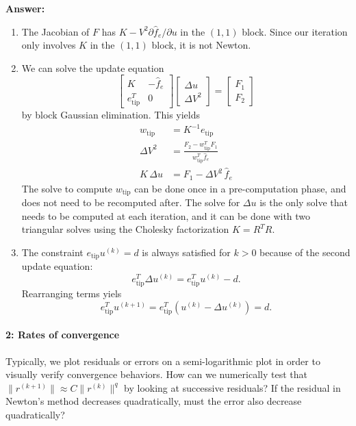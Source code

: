 \documentclass[12pt, leqno]{article}
\begin{document}
{\bf Answer:}
\begin{enumerate}
\item The Jacobian of $F$ has $K-V^2 \partial \hat{f}_e/\partial u$
  in the $(1,1)$ block.  Since our iteration only involves $K$ in the
  $(1,1)$ block, it is not Newton.
\item We can solve the update equation
  \[
  \begin{bmatrix}
    K & -\hat{f}_e \\
    e_{\mathrm{tip}}^T & 0
  \end{bmatrix}
  \begin{bmatrix} \Delta u \\ \Delta V^2 \end{bmatrix} =
  \begin{bmatrix} F_1 \\ F_2 \end{bmatrix}
  \]
  by block Gaussian elimination.  This yields
  \begin{align*}
    w_{\mathrm{tip}} &= K^{-1} e_{\mathrm{tip}} \\
    \Delta V^2 &=
      \frac{F_2-w_{\mathrm{tip}}^T F_1}
           {w_{\mathrm{tip}}^T \hat{f}_e} \\
    K \, \Delta u &= F_1 - \Delta V^2 \, \hat{f}_e
  \end{align*}
  The solve to compute $w_{\mathrm{tip}}$ can be done once in a
  pre-computation phase, and does not need to be recomputed after.
  The solve for $\Delta u$ is the only solve that needs to be
  computed at each iteration, and it can be done with two
  triangular solves using the Cholesky factorization $K = R^T R$.
\item The constraint $e_{\mathrm{tip}} u^{(k)} = d$ is always
  satisfied for $k > 0$ because of the second update equation:
  \[
    e_{\mathrm{tip}}^T \Delta u^{(k)} =e_{\mathrm{tip}}^T u^{(k)}-d.
  \]
  Rearranging terms yiels
  \[
    e_{\mathrm{tip}}^T u^{(k+1)} =  
    e_{\mathrm{tip}}^T \left( u^{(k)}-\Delta u^{(k)} \right) = d.
  \]
\end{enumerate}


\paragraph*{2: Rates of convergence}
Typically, we plot residuals or errors on a semi-logarithmic plot in
order to visually verify convergence behaviors.  How can we
numerically test that $\|r^{(k+1)}\| \approx C \|r^{(k)}\|^q$ by
looking at successive residuals?  If the residual in Newton's method
decreases quadratically, must the error also decrease quadratically?
\end{document}

